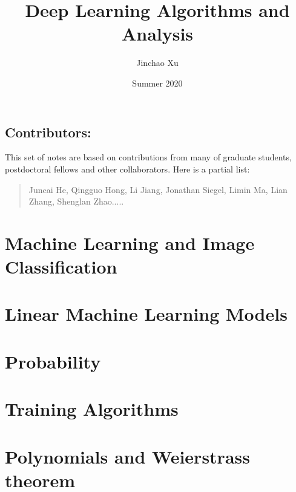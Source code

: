 \documentclass[leqno,labelfig,psfigt,colorlinks]{svmono}
\title{Deep Learning Algorithms and Analysis}
\author{Jinchao Xu}
\date{Summer 2020}
\begin{document}
	\maketitle

\section*{Contributors:}
This set of notes are based on contributions from many of graduate
students, postdoctoral fellows and other collaborators.   Here is a
partial list:
\begin{quote}
Juncai He, Qingguo Hong, Li Jiang, Jonathan Siegel, Limin Ma, Lian Zhang, Shenglan Zhao.....
\end{quote}

\newpage


\tableofcontents

%
%

\chapter{Machine Learning and Image Classification} 



\chapter{Linear Machine Learning Models}





\chapter{Probability}




\chapter{Training Algorithms}




\chapter{Polynomials and Weierstrass theorem}

\end{document}
